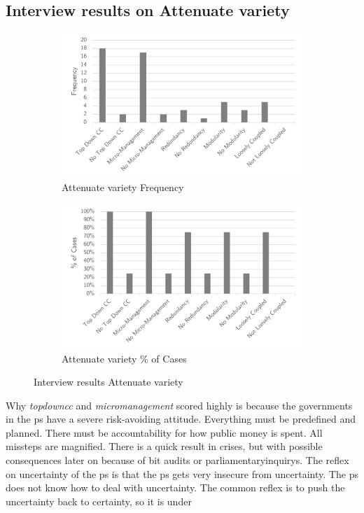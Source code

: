 \subsection{Interview results on Attenuate variety}
\label{sub:interviewresultsattenuate}
\begin{figure}[H]
	\centering
	\begin{subfigure}[H]{0.5\textwidth}
		\centering
		\includegraphics[width=0.95\linewidth]{images/attenuate_frequency}
		\caption{Attenuate variety Frequency}
		\label{fig:attenuatefrequency}
	\end{subfigure}%
	\begin{subfigure}[H]{0.5\textwidth}
		\centering
		\includegraphics[width=0.95\linewidth]{images/attenuate_cases}
		\caption{Attenuate variety \% of Cases}
		\label{fig:attenuatecases}
	\end{subfigure}
	\caption{Interview results Attenuate variety}
	\label{fig:interviewattenuatevariety}
\end{figure}
Why \textit{\gls{topdowncc}} and \textit{\gls{micromanagement}} scored highly is because the governments in the \gls{ps} have a severe risk-avoiding attitude. Everything must be predefined and planned. There must be accountability for how public money is spent. All missteps are magnified. There is a quick result in crises, but with possible consequences later on because of \acrfull{bit} audits or \glspl{parliamentaryinquiry}. The reflex on \gls{uncertainty} of the \gls{ps} is that the \gls{ps} gets very insecure from \gls{uncertainty}. The \gls{ps} does not know how to deal with \gls{uncertainty}. The common reflex is to push the \gls{uncertainty} back to certainty, so it is under
